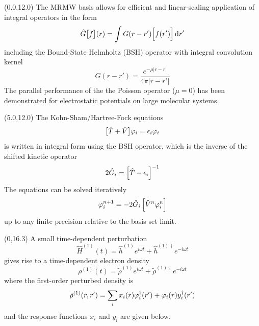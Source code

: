 \documentclass[a0,draft,portrait]{a0poster}
\begin{document}
\begin{textblock}{4.3}(0.0,12.0)
The MRMW basis allows for efficient and linear-scaling application of integral
operators in the form
\begin{equation}
    \hat{G}\big[f\big](r) = \int G(r-r')\Big[f(r')\Big]\,\mathrm{d} r'
\end{equation}
including the Bound-State Helmholtz (BSH) operator with integral convolution 
kernel
\begin{equation}
    G(r-r') = \frac{e^{-\mu|r-r|}}{4\pi|r-r'|}
\end{equation}
The parallel performance of the the Poisson operator 
($\mu = 0$) has been demonstrated for electrostatic potentials on large 
molecular systems\cite{Jensen}. 
\end{textblock}

\begin{textblock}{4.3}(5.0,12.0)
The Kohn-Sham/Hartree-Fock equations 
\begin{equation}
    \big[\hat{T} + \hat{V}\big]\varphi_i = \epsilon_i\varphi_i
\end{equation}
is written in integral form using the BSH operator, 
which is the inverse of the shifted kinetic operator
\begin{equation}
    2\hat{G}_i   = \Big[\hat{T}-\epsilon_i\Big]^{-1}
\end{equation}
The equations can be solved iteratively\cite{Harrison}
\begin{equation}
    \label{eq:unperturbed_scf}
    \varphi^{n+1}_i = -2 \hat{G}_i\left[\hat{V}^n\varphi^n_i\right]
\end{equation}
up to any finite precision relative to the basis set limit.
\end{textblock}

\begin{textblock}{4.3}(0,16.3)
A small time-dependent perturbation
\begin{equation}
    \hat{H}^{(1)}(t) = 
    \hat{h}^{(1)}e^{i\omega t} +
    \hat{h}^{(1)\dag}e^{-i\omega t}
\end{equation}
gives rise to a time-dependent electron density
\begin{equation}
    \rho^{(1)}(t) = 
    \tilde{\rho}^{(1)}e^{i\omega t} +
    \tilde{\rho}^{(1)\dag}e^{-i\omega t}
\end{equation}
where the first-order perturbed density is
\begin{equation}
    \tilde{\rho}^{(1)}(r,r') = 
    \sum_i x_i(r)\varphi_i^\dag(r') + \varphi_i(r)y_i^\dag(r')
\end{equation}
and the response functions $x_i$ and $y_i$ are given below.
\end{textblock}
\end{document}
